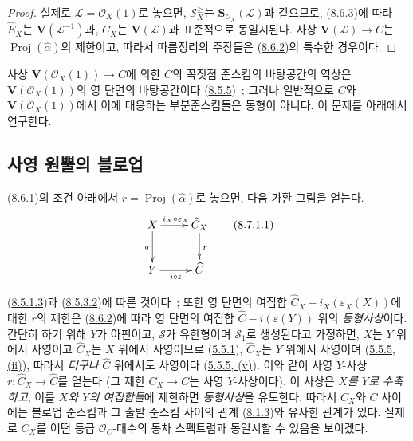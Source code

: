 \begin{proof}
실제로 $\mathcal{L}=\mathcal{O}_X(1)$로 놓으면,
$\mathcal{S}_X^{\geq}$는
$\mathbf{S}_{\mathcal{O}_X}(\mathcal{L})$과 같으므로,
(\hyperref[II.8.6.3-ko]{8.6.3})에 따라 $\widehat{E}_X$는
$\mathbf{V}(\mathcal{L}^{-1})$과, $C_X$는
$\mathbf{V}(\mathcal{L})$과 표준적으로 동일시된다. 사상
$\mathbf{V}(\mathcal{L})\to C$는
$\operatorname{Proj}(\widehat{\alpha})$의 제한이고, 따라서 따름정리의
주장들은 (\hyperref[II.8.6.2-ko]{8.6.2})의 특수한 경우이다.
\end{proof}

사상 $\mathbf{V}(\mathcal{O}_X(1))\to C$에 의한 $C$의 꼭짓점
준스킴의 바탕공간의 역상은 $\mathbf{V}(\mathcal{O}_X(1))$의 영
단면의 바탕공간이다
(\hyperref[II.8.5.5-ko]{8.5.5})~; 그러나 일반적으로 $C$와
$\mathbf{V}(\mathcal{O}_X(1))$에서 이에 대응하는 부분준스킴들은
동형이 아니다. 이 문제를 아래에서 연구한다.

\subsection{사영 원뿔의 블로업}
\label{subsection:II.8.7-ko}

\begin{env}[8.7.1]
\label{II.8.7.1-ko}
(\hyperref[II.8.6.1-ko]{8.6.1})의 조건 아래에서
$r=\operatorname{Proj}(\widehat{\alpha})$로 놓으면, 다음 가환 그림을
얻는다.
\begin{equation}
\label{II.8.7.1.1-ko}
  \xymatrix{
    X\ar[r]^{i_X\circ\varepsilon_X}\ar[d]_{q} &
    \widehat{C}_X\ar[d]^{r}\\
    Y\ar[r]_{i\circ\varepsilon} & \widehat{C}
  }
\tag{8.7.1.1}
\end{equation}

(\hyperref[II.8.5.1.3-ko]{8.5.1.3})과
(\hyperref[II.8.5.3.2-ko]{8.5.3.2})에 따른 것이다~; 또한 영 단면의
여집합 $\widehat{C}_X-i_X(\varepsilon_X(X))$에 대한 $r$의 제한은
(\hyperref[II.8.6.2-ko]{8.6.2})에 따라 영 단면의 여집합
$\widehat{C}-i(\varepsilon(Y))$ 위의 \emph{동형사상}이다. 간단히 하기
위해 $Y$가 아핀이고, $\mathcal{S}$가 유한형이며 $\mathcal{S}_1$로
생성된다고 가정하면, $X$는 $Y$ 위에서 사영이고 $\widehat{C}_X$는
$X$ 위에서 사영이므로 (\hyperref[II.5.5.1-ko]{5.5.1}),
$\widehat{C}_X$는 $Y$ 위에서 사영이며
(\hyperref[II.5.5.5-ko]{5.5.5, (ii)}), 따라서 \emph{더구나}
$\widehat{C}$ 위에서도 사영이다
(\hyperref[II.5.5.5-ko]{5.5.5, (v)}). 이와 같이 사영 $Y$-사상
$r:\widehat{C}_X\to\widehat{C}$를 얻는다 (그 제한
$C_X\to C$는 사영 $Y$-사상이다). 이 사상은 \emph{$X$를 $Y$로
수축하고}, 이를 \emph{$X$와 $Y$의 여집합들}에 제한하면
\emph{동형사상}을 유도한다. 따라서 $C_X$와 $C$ 사이에는 블로업
준스킴과 그 출발 준스킴 사이의 관계
(\hyperref[II.8.1.3-ko]{8.1.3})와 유사한 관계가 있다. 실제로
$C_X$를 어떤 등급 $\mathcal{O}_C$-대수의 동차 스펙트럼과 동일시할
수 있음을 보이겠다.
\end{env}

